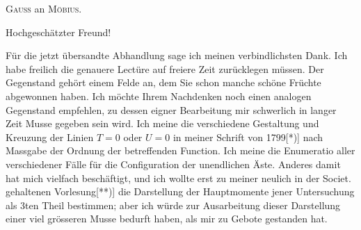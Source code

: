 \begin{center}\large\textsc{Gauss} an \textsc{Möbius}.\end{center}
\begin{center}Hochgeschätzter Freund!\end{center}
\noindent{}\par
\noindent\hspace*{\parindent}Für die jetzt übersandte Abhandlung sage ich meinen verbindlichsten
Dank. Ich habe freilich die genauere Lectüre auf freiere Zeit zurücklegen müssen.
Der Gegenstand gehört einem Felde an, dem Sie schon manche schöne Früchte abgewonnen haben.
Ich möchte Ihrem Nachdenken noch einen analogen Gegenstand empfehlen, zu dessen eigner
Bearbeitung mir schwerlich in langer Zeit Musse gegeben sein wird. Ich meine die verschiedene
Gestaltung und Kreuzung der Linien $T=0$ oder $U=0$ in meiner Schrift von 1799[*)] nach Massgabe
der Ordnung der betreffenden Function. Ich meine die Enumeratio aller verschiedener Fälle
für die Configuration der unendlichen Äste. Anderes damit  hat mich
vielfach beschäftigt, und ich wollte erst zu meiner neulich in der Societ. gehaltenen Vorlesung[**)]
die Darstellung der Hauptmomente jener Untersuchung als 3ten Theil bestimmen; aber ich würde
zur Ausarbeitung dieser Darstellung einer viel grösseren Musse bedurft haben, als mir zu
Gebote gestanden hat.

